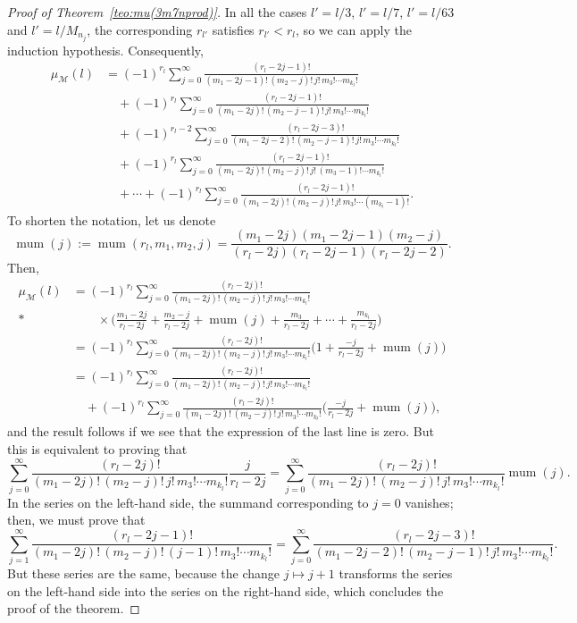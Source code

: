\documentclass[11pt, a4paper]{article}
\newcommand{\calM}{\mathcal{M}}
\newcommand{\muM}{\mu_\calM}
\newcommand{\mum}{\operatorname{mum}}
\theoremstyle{plain}
\theoremstyle{definition}
\begin{document}
\begin{proof}[Proof of Theorem~\ref{teo:mu(3m7nprod)}]
In all the cases $l' = l/3$, $l' = l/7$, $l' = l/63$ and $l' = l/M_{n_j}$, the corresponding $r_{l'}$ satisfies $r_{l'} < r_l$, so we can apply the induction hypothesis. Consequently,
\begin{align*}
\muM(l) %
  &= (-1)^{r_l} \sum_{j=0}^{\infty} \frac{(r_l-2j-1)!}{(m_1-2j-1)!\,(m_2-j)!\,j!\,m_3! \cdots m_{k_l}!} \\
  &\quad+ (-1)^{r_l} \sum_{j=0}^{\infty} \frac{(r_l-2j-1)!}{(m_1-2j)!\,(m_2-j-1)!\,j!\,m_3! \cdots m_{k_l}!} \\
  &\quad+ (-1)^{r_l-2} \sum_{j=0}^{\infty} \frac{(r_l-2j-3)!}{(m_1-2j-2)!\,(m_2-j-1)!\,j!\,m_3! \cdots m_{k_l}!} \\
  &\quad+ (-1)^{r_l} \sum_{j=0}^{\infty} \frac{(r_l-2j-1)!}{(m_1-2j)!\,(m_2-j)!\,j!\,(m_3-1)! \cdots m_{k_l}!} \\
  &\quad+ \cdots 
  + (-1)^{r_l} \sum_{j=0}^{\infty} \frac{(r_l-2j-1)!}{(m_1-2j)!\,(m_2-j)!\,j!\,m_3! \cdots (m_{k_l}-1)!}.
\end{align*}
To shorten the notation, let us denote
\[
  \mum(j) :=
  \mum(r_l,m_1,m_2,j) = \frac{(m_1-2j)(m_1-2j-1)(m_2-j)}{(r_l-2j)(r_l-2j-1)(r_l-2j-2)}.
\]
Then,
\begin{align*}
  \muM(l)
  &= (-1)^{r_l} \sum_{j=0}^{\infty} \frac{(r_l-2j)!}{(m_1-2j)!\,(m_2-j)!\,j!\,m_3! \cdots m_{k_l}!} \\*
  &\qquad\times \bigg( \frac{m_1-2j}{r_l-2j} + \frac{m_2-j}{r_l-2j} + \mum(j) 
  + \frac{m_3}{r_l-2j} + \cdots + \frac{m_{k_l}}{r_l-2j} \bigg) \\ 
  &= (-1)^{r_l} \sum_{j=0}^{\infty} \frac{(r_l-2j)!}{(m_1-2j)!\,(m_2-j)!\,j!\,m_3! \cdots m_{k_l}!} 
  \bigg( 1 + \frac{-j}{r_l-2j} + \mum(j) \bigg) \\
  &= (-1)^{r_l} \sum_{j=0}^{\infty} \frac{(r_l-2j)!}{(m_1-2j)!\,(m_2-j)!\,j!\,m_3! \cdots m_{k_l}!} \\
  & \quad+ (-1)^{r_l} \sum_{j=0}^{\infty} \frac{(r_l-2j)!}{(m_1-2j)!\,(m_2-j)!\,j!\,m_3! \cdots m_{k_l}!}
  \bigg( \frac{-j}{r_l-2j} + \mum(j) \bigg),
\end{align*}
and the result follows if we see that the expression of the last line is zero.
But this is equivalent to proving that
\[
  \sum_{j=0}^{\infty} \frac{(r_l-2j)!}{(m_1-2j)!\,(m_2-j)!\,j!\,m_3! \cdots m_{k_l}!} \frac{j}{r_l-2j}
  = \sum_{j=0}^{\infty} \frac{(r_l-2j)!}{(m_1-2j)!\,(m_2-j)!\,j!\,m_3! \cdots m_{k_l}!} \mum(j).
\]
In the series on the left-hand side, the summand corresponding to $j=0$ vanishes; then, we must prove that
\[
  \sum_{j=1}^{\infty} \frac{(r_l-2j-1)!}{(m_1-2j)!\,(m_2-j)!\,(j-1)!\,m_3! \cdots m_{k_l}!} 
  = \sum_{j=0}^{\infty} \frac{(r_l-2j-3)!}{(m_1-2j-2)!\,(m_2-j-1)!\,j!\,m_3! \cdots m_{k_l}!}.
\]
But these series are the same, because the change $j \mapsto j+1$ transforms the series on the left-hand side into the series on the right-hand side, which concludes the proof of the theorem.
\end{proof}
\end{document}
